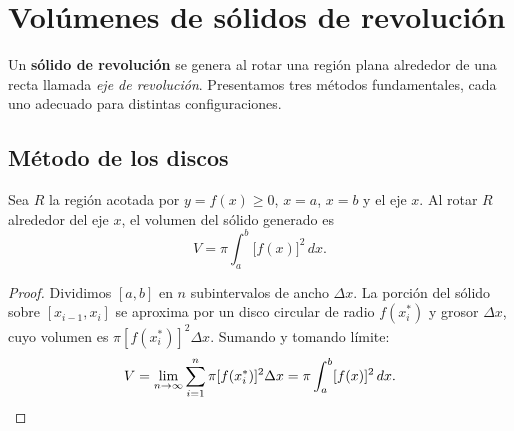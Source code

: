 \section{Volúmenes de sólidos de revolución}

Un \textbf{sólido de revolución} se genera al rotar una región plana
alrededor de una recta llamada \emph{eje de revolución}. Presentamos tres
métodos fundamentales, cada uno adecuado para distintas configuraciones.

\subsection{Método de los discos}

\begin{theorem}
Sea $R$ la región acotada por $y=f(x)\geq 0$, $x=a$, $x=b$ y el eje $x$.
Al rotar $R$ alrededor del eje $x$, el volumen del sólido generado es
\[
  V = \pi\int_a^b\bigl[f(x)\bigr]^2\,dx.
\]
\end{theorem}

\begin{proof}
Dividimos $[a,b]$ en $n$ subintervalos de ancho $\Delta x$. La porción del
sólido sobre $[x_{i-1},x_i]$ se aproxima por un disco circular de radio
$f(x_i^*)$ y grosor $\Delta x$, cuyo volumen es $\pi[f(x_i^*)]^2\Delta x$.
Sumando y tomando límite:
\[
  V = \lim_{n\to\infty}\sum_{i=1}^n\pi[f(x_i^*)]^2\Delta x
    = \pi\int_a^b[f(x)]^2\,dx.\qedhere
\]
\end{proof}

